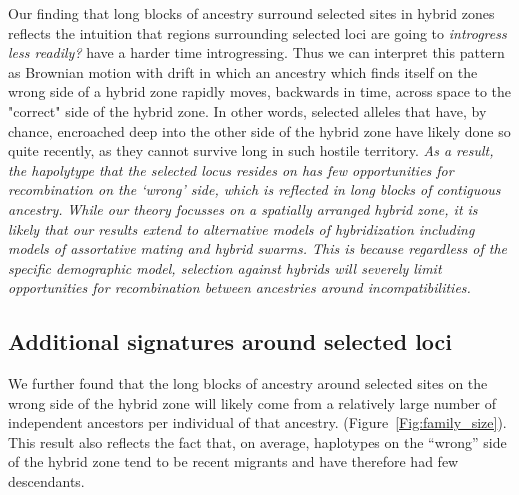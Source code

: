 \documentclass[12pt]{article}
\newcommand{\alisa}[1]{{\em \color{red} #1}}
\newcommand{\yb}[1]{{\em \color{magenta} #1}}
\begin{document}

Our finding that long blocks of ancestry surround selected sites in hybrid zones reflects the intuition that regions surrounding selected loci are going to \alisa{introgress less readily?} have a harder time introgressing. 
Thus we can interpret this pattern as Brownian motion with drift in which an ancestry which finds itself on the wrong side of a hybrid zone rapidly moves, backwards in time, across space to the "correct" side of the hybrid zone.  In other words, selected alleles that have, by chance, encroached deep into the other side of the hybrid zone have likely done so quite recently, as they cannot survive long in such hostile territory.  \alisa{As a result, the hapolytype that the selected locus resides on has few opportunities for recombination on the `wrong' side, which is reflected in long blocks of contiguous ancestry.}
\yb{While our theory focusses on a spatially arranged hybrid zone, it is likely that our results extend to alternative models of hybridization including models of assortative mating and hybrid swarms. This is because regardless of the specific demographic model, selection against hybrids will severely limit opportunities for recombination between ancestries around incompatibilities.}

\subsection*{Additional signatures around selected loci} 

We further found that the long blocks of ancestry around selected sites on the wrong side of the hybrid zone will likely come from a relatively large number of independent ancestors per individual of that ancestry. (Figure~\ref{Fig:family_size}). %
This result also reflects the fact that, on average, haplotypes on the ``wrong'' side of the hybrid zone tend to be recent migrants and have therefore had few descendants. 
\end{document}
